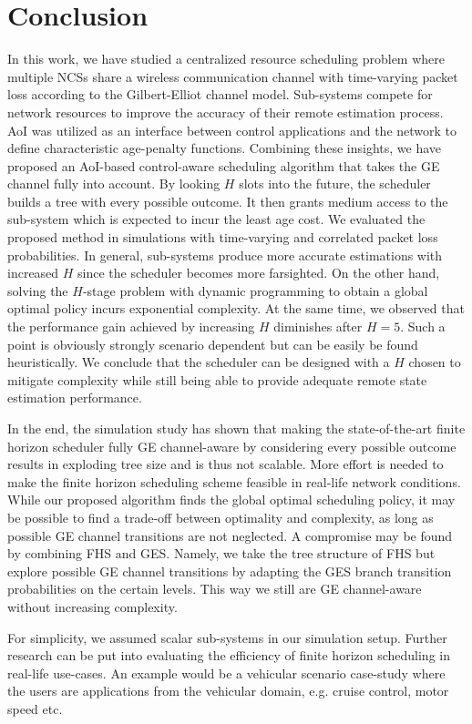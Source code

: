 \chapter{Conclusion}

In this work, we have studied a centralized resource scheduling problem where
multiple NCSs share a wireless communication channel with time-varying packet
loss according to the Gilbert-Elliot channel model. Sub-systems compete for
network resources to improve the accuracy of their remote estimation process.
AoI was utilized as an interface between control applications and the network to
define characteristic age-penalty functions. Combining these insights, we have
proposed an AoI-based control-aware scheduling algorithm that takes the GE
channel fully into account. By looking $H$ slots into the future, the scheduler
builds a tree with every possible outcome. It then grants medium access to the
sub-system which is expected to incur the least age cost. We evaluated the
proposed method in simulations with time-varying and correlated packet loss
probabilities. In general, sub-systems produce more accurate estimations with
increased $H$ since the scheduler becomes more farsighted. On the other hand,
solving the $H$-stage problem with dynamic programming to obtain a global
optimal policy incurs exponential complexity. At the same time, we observed that
the performance gain achieved by increasing $H$ diminishes after $H=5$. Such a
point is obviously strongly scenario dependent but can be easily be found
heuristically. We conclude that the scheduler can be designed with a $H$ chosen
to mitigate complexity while still being able to provide adequate remote state
estimation performance. 

In the end, the simulation study has shown that making the state-of-the-art
finite horizon scheduler fully GE channel-aware by considering every possible
outcome results in exploding tree size and is thus not scalable. More effort is
needed to make the finite horizon scheduling scheme feasible in real-life
network conditions. While our proposed algorithm finds the global optimal
scheduling policy, it may be possible to find a trade-off between optimality and
complexity, as long as possible GE channel transitions are not neglected. A
compromise may be found by combining FHS and GES. Namely, we take the tree
structure of FHS but explore possible GE channel transitions by adapting the GES
branch transition probabilities on the certain levels. This way we still are GE
channel-aware without increasing complexity.

For simplicity, we assumed scalar sub-systems in our simulation setup. Further
research can be put into evaluating the efficiency of finite horizon scheduling
in real-life use-cases. An example would be a vehicular scenario case-study
where the users are applications from the vehicular domain, e.g. cruise control,
motor speed etc. 

